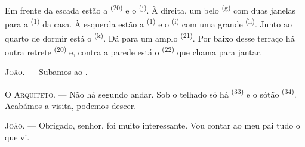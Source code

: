 \VUsaut{3.0mm}
\VUsaut{3.0mm}

Em frente da escada estão a  \textsuperscript{(20)} e o
 \textsuperscript{(j)}. À direita, um belo  \textsuperscript{(g)} com duas janelas para a 
\textsuperscript{(1)} da casa. À esquerda estão a 
\textsuperscript{(1)} e o  \textsuperscript{(i)} com uma
grande  \textsuperscript{(h)}. Junto ao quarto de dormir está o
 \textsuperscript{(k)}. Dá para um amplo
 \textsuperscript{(21)}. Por baixo desse terraço há outra
retrete \textsuperscript{(20)} e, contra a parede está o 
\textsuperscript{(22)} que chama para jantar.

\textsc{João}. --- Subamos ao .

\textsc{O Arquiteto}. --- Não há segundo andar. Sob o telhado só há
 \textsuperscript{(33)} e o sótão \textsuperscript{(34)}.
Acabámos a visita, podemos descer.

\textsc{João}. --- Obrigado, senhor, foi muito interessante. Vou contar ao
meu pai tudo o que vi.
\VUsaut{4.0mm}
\VUfilet{22mm}
